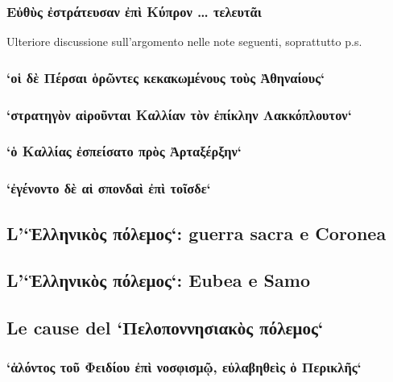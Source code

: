 
            \subsubsection{\textgreek{Εὐθὺς ἐστράτευσαν ἐπὶ Κύπρον … τελευτᾶι}}
             Ulteriore discussione sull'argomento nelle note seguenti, soprattutto p.s.
            \subsubsection{`οἱ δὲ Πέρσαι ὁρῶντες κεκακωμένους τοὺς Ἀθηναίους`}
           
            \subsubsection{`στρατηγὸν αἱροῦνται Καλλίαν τὸν ἐπίκλην Λακκόπλουτον`}
             
            \subsubsection{`ὁ Καλλίας ἐσπείσατο πρὸς Ἀρταξέρξην`}
             
            \subsubsection{`ἐγένοντο δὲ αἱ σπονδαὶ ἐπὶ τοῖσδε`} 
          
            \subsection*{L'`Ἑλληνικὸς πόλεμος`: guerra sacra e Coronea}
            
            \subsection*{L'`Ἑλληνικὸς πόλεμος`: Eubea e Samo}
           
                        
            \subsection*{Le cause del `Πελοποννησιακὸς πόλεμος`}
            
            
            \subsubsection{`ἁλόντος τοῦ Φειδίου ἐπὶ νοσφισμῷ, εὐλαβηθεὶς ὁ Περικλῆς`}
            
